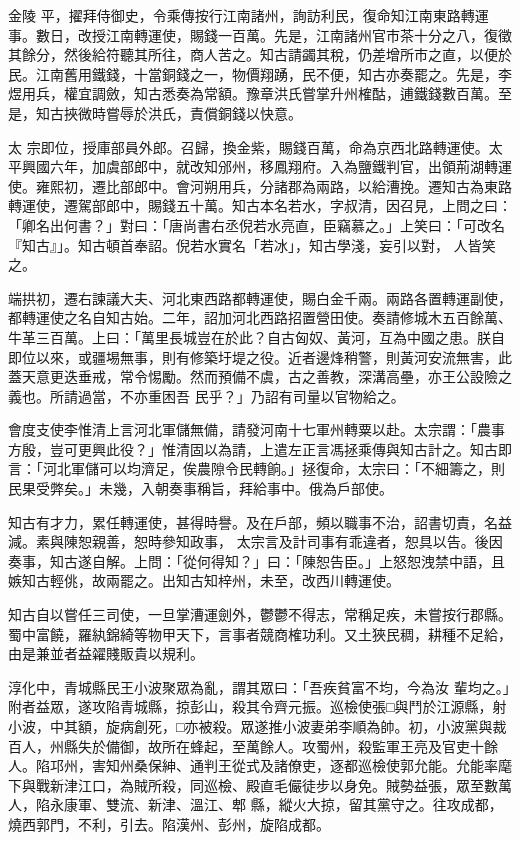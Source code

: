 \begin{pinyinscope}
 金陵
 平，擢拜侍御史，令乘傳按行江南諸州，詢訪利民，復命知江南東路轉運事。數日，改授江南轉運使，賜錢一百萬。先是，江南諸州官市茶十分之八，復徵其餘分，然後給符聽其所往，商人苦之。知古請蠲其稅，仍差增所市之直，以便於民。江南舊用鐵錢，十當銅錢之一，物價翔踴，民不便，知古亦奏罷之。先是，李煜用兵，權宜調斂，知古悉奏為常額。豫章洪氏嘗掌升州榷酤，逋鐵錢數百萬。至是，知古挾微時嘗辱於洪氏，責償銅錢以快意。



 太
 宗即位，授庫部員外郎。召歸，換金紫，賜錢百萬，命為京西北路轉運使。太平興國六年，加虞部郎中，就改知邠州，移鳳翔府。入為鹽鐵判官，出領荊湖轉運使。雍熙初，遷比部郎中。會河朔用兵，分諸郡為兩路，以給漕挽。遷知古為東路轉運使，遷駕部郎中，賜錢五十萬。知古本名若水，字叔清，因召見，上問之曰：「卿名出何書？」對曰：「唐尚書右丞倪若水亮直，臣竊慕之。」上笑曰：「可改名『知古』」。知古頓首奉詔。倪若水實名「若冰」，知古學淺，妄引以對，
 人皆笑之。



 端拱初，遷右諫議大夫、河北東西路都轉運使，賜白金千兩。兩路各置轉運副使，都轉運使之名自知古始。二年，詔加河北西路招置營田使。奏請修城木五百餘萬、牛革三百萬。上曰：「萬里長城豈在於此？自古匈奴、黃河，互為中國之患。朕自即位以來，或疆埸無事，則有修築圩堤之役。近者邊烽稍警，則黃河安流無害，此蓋天意更迭垂戒，常令惕勵。然而預備不虞，古之善教，深溝高壘，亦王公設險之義也。所請過當，不亦重困吾
 民乎？」乃詔有司量以官物給之。



 會度支使李惟清上言河北軍儲無備，請發河南十七軍州轉粟以赴。太宗謂：「農事方殷，豈可更興此役？」惟清固以為請，上遣左正言馮拯乘傳與知古計之。知古即言：「河北軍儲可以均濟足，俟農隙令民轉餉。」拯復命，太宗曰：「不細籌之，則民果受弊矣。」未幾，入朝奏事稱旨，拜給事中。俄為戶部使。



 知古有才力，累任轉運使，甚得時譽。及在戶部，頻以職事不治，詔書切責，名益減。素與陳恕親善，恕時參知政事，
 太宗言及計司事有乖違者，恕具以告。後因奏事，知古遂自解。上問：「從何得知？」曰：「陳恕告臣。」上怒恕洩禁中語，且嫉知古輕佻，故兩罷之。出知古知梓州，未至，改西川轉運使。



 知古自以嘗任三司使，一旦掌漕運劍外，鬱鬱不得志，常稱足疾，未嘗按行郡縣。蜀中富饒，羅紈錦綺等物甲天下，言事者競商榷功利。又土狹民稠，耕種不足給，由是兼並者益糴賤販貴以規利。



 淳化中，青城縣民王小波聚眾為亂，謂其眾曰：「吾疾貧富不均，今為汝
 輩均之。」附者益眾，遂攻陷青城縣，掠彭山，殺其令齊元振。巡檢使張□與鬥於江源縣，射小波，中其額，旋病創死，□亦被殺。眾遂推小波妻弟李順為帥。初，小波黨與裁百人，州縣失於備御，故所在蜂起，至萬餘人。攻蜀州，殺監軍王亮及官吏十餘人。陷邛州，害知州桑保紳、通判王從式及諸僚吏，逐都巡檢使郭允能。允能率麾下與戰新津江口，為賊所殺，同巡檢、殿直毛儼徒步以身免。賊勢益張，眾至數萬人，陷永康軍、雙流、新津、溫江、郫
 縣，縱火大掠，留其黨守之。往攻成都，燒西郭門，不利，引去。陷漢州、彭州，旋陷成都。




\end{pinyinscope}
